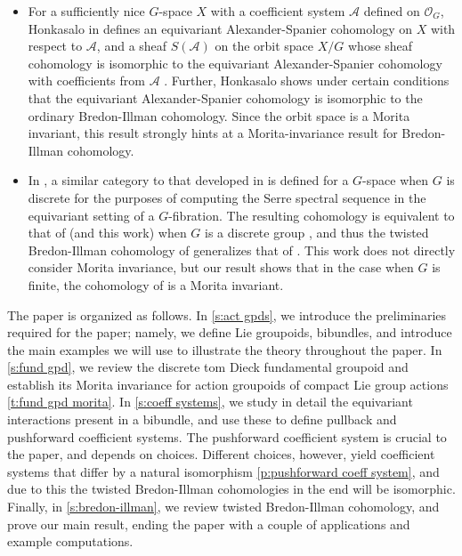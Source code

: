 \documentclass[12pt,reqno]{amsart}
\newcommand{\orbit}{\ensuremath{\mathcal{O}_G}}
\newcommand{\calA}{{\mathcal{A}}}
\theoremstyle{plain}
\theoremstyle{definition}
\begin{document}
\begin{itemize}
    \item For a sufficiently nice $G$-space $X$ with a coefficient system $\calA$ defined on $\orbit$,  Honkasalo in \cite{honkasalo} defines an equivariant Alexander-Spanier cohomology on $X$ with respect to $\calA$, and a sheaf $S(\calA)$ on the orbit space $X/G$ whose sheaf cohomology is isomorphic to the equivariant Alexander-Spanier cohomology with coefficients from $\calA$ \cite[Theorem 5.5]{honkasalo}.  Further, Honkasalo shows under certain conditions that the equivariant Alexander-Spanier cohomology is isomorphic to the ordinary Bredon-Illman cohomology.  Since the orbit space is a Morita invariant, this result strongly hints at a Morita-invariance result for Bredon-Illman cohomology.
        \item In \cite{moerdijk-svensson}, a similar category to that developed in \cite{MuMu} is defined for a $G$-space when  $G$ is discrete for the purposes of computing the Serre spectral sequence in the equivariant setting of a $G$-fibration.  The resulting cohomology is equivalent to that of \cite{MuMu} (and this work)  when $G$ is a discrete group \cite{mukherjee-pandey}, and thus the twisted Bredon-Illman cohomology of \cite{MuMu} generalizes that of \cite{moerdijk-svensson}.   This work does not directly consider Morita invariance, but our result shows that in the case when $G$ is finite, the cohomology of \cite{moerdijk-svensson} is a Morita invariant.        
    \end{itemize}

The paper is organized as follows.  In \cref{s:act gpds}, we introduce the preliminaries required for the paper; namely, we define Lie groupoids, bibundles, and introduce the main examples we will use to illustrate the theory throughout the paper.  In \cref{s:fund gpd}, we review the discrete tom Dieck fundamental groupoid and establish its Morita invariance for action groupoids of compact Lie group actions \cref{t:fund gpd morita}. In \cref{s:coeff systems}, we study in detail the equivariant interactions present in a bibundle, and use these to define pullback and pushforward coefficient systems.  The pushforward coefficient system is crucial to the paper, and depends on choices.  Different choices, however, yield coefficient systems that differ by a natural isomorphism \cref{p:pushforward coeff system}, and due to this the twisted Bredon-Illman cohomologies in the end will be isomorphic.  Finally, in \cref{s:bredon-illman}, we review twisted Bredon-Illman cohomology, and prove our main result, ending the paper with a couple of applications and example computations.
\end{document}
